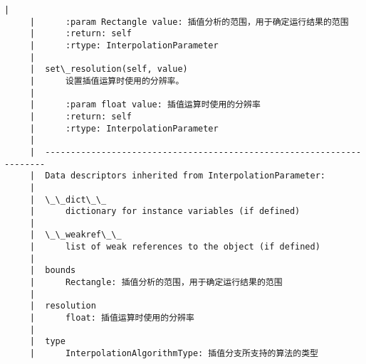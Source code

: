 \documentclass[11pt]{article}
\begin{document}
\begin{Verbatim}[commandchars=\\\{\}]
     |      
     |      :param Rectangle value: 插值分析的范围，用于确定运行结果的范围
     |      :return: self
     |      :rtype: InterpolationParameter
     |  
     |  set\_resolution(self, value)
     |      设置插值运算时使用的分辨率。
     |      
     |      :param float value: 插值运算时使用的分辨率
     |      :return: self
     |      :rtype: InterpolationParameter
     |  
     |  ----------------------------------------------------------------------
     |  Data descriptors inherited from InterpolationParameter:
     |  
     |  \_\_dict\_\_
     |      dictionary for instance variables (if defined)
     |  
     |  \_\_weakref\_\_
     |      list of weak references to the object (if defined)
     |  
     |  bounds
     |      Rectangle: 插值分析的范围，用于确定运行结果的范围
     |  
     |  resolution
     |      float: 插值运算时使用的分辨率
     |  
     |  type
     |      InterpolationAlgorithmType: 插值分支所支持的算法的类型
    

\end{Verbatim}
\end{document}
